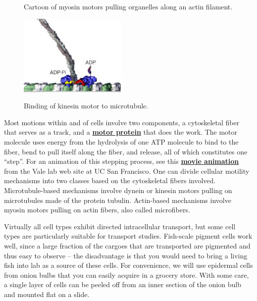 \documentclass{../lab}
\begin{document}
\begin{figure}[h]
\begin{minipage}{0.32\linewidth}
    \caption{Cartoon of myosin motors pulling organelles along an actin filament.}
\end{minipage}\hfill
\begin{minipage}{0.32\linewidth}
    \centering
    \href{http://experimentationlab.berkeley.edu/sites/default/files/images/196px-Kinesin.jpg}{\includegraphics[width=\linewidth,keepaspectratio]{images/196px-Kinesin.jpg}} \\
    \caption{Binding of kinesin motor to microtubule.}
\end{minipage} 
\end{figure}

Most motions within and of cells involve two components, a cytoskeletal fiber that serves as a track, and a \href{http://physics111.lib.berkeley.edu/Physics111/Reprints/OTZ/biowikipedia.pdf}{\textbf{motor protein}} that does the work. The motor molecule uses energy from the hydrolysis of one ATP molecule to bind to the fiber, bend to pull itself along the fiber, and release, all of which constitutes one ``step''. For an animation of this stepping process, see this \href{http://experimentationlab.berkeley.edu/sites/default/files/Kinesin_Motion.mp4}{\textbf{movie animation}} from the Vale lab web site at UC San Francisco. One can divide cellular motility mechanisms into two classes based on the cytoskeletal fibers involved. Microtubule-based mechanisms involve dynein or kinesin motors pulling on microtubules made of the protein tubulin. Actin-based mechanisms involve myosin motors pulling on actin fibers, also called microfibers.

Virtually all cell types exhibit directed intracellular transport, but some cell types are particularly suitable for transport studies. Fish-scale pigment cells work well, since a large fraction of the cargoes that are transported are pigmented and thus easy to observe – the disadvantage is that you would need to bring a living fish into lab as a source of these cells. For convenience, we will use epidermal cells from onion bulbs that you can easily acquire in a grocery store. With some care, a single layer of cells can be peeled off from an inner section of the onion bulb and mounted flat on a slide.
\end{document}
